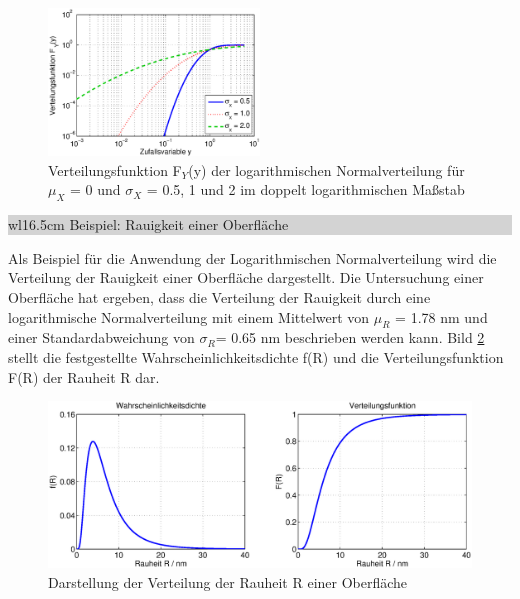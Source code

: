 \begin{figure}[H]
  \centerline{\includegraphics[width=0.5\textwidth]{Kapitel4/Bilder/image38}}
  \caption{Verteilungsfunktion F${}_{Y}$(y) der logarithmischen Normalverteilung f\"{u}r $\mu_{X}$ = 0 und $\sigma_{X}$ = 0.5, 1 und 2 im doppelt logarithmischen Ma{\ss}stab}
  \label{fig:Stetig_Lognormal2}
\end{figure}

\noindent
\colorbox{lightgray}{%
%
\renewcommand\arraystretch{0.6}%
\begin{tabular}{ wl{16.5cm} }
{\selectfont
\noindent
Beispiel: Rauigkeit einer Oberfl\"{a}che}
\end{tabular}%
}\bigskip

\noindent Als Beispiel f\"{u}r die Anwendung der Logarithmischen Normalverteilung wird die Verteilung der Rauigkeit einer Oberfl\"{a}che dargestellt. Die Untersuchung einer Oberfl\"{a}che hat ergeben, dass die Verteilung der Rauigkeit durch eine logarithmische Normalverteilung mit einem Mittelwert von $\mu_{R}$ = 1.78 nm und einer Standardabweichung von $\sigma_{R}$= 0.65 nm beschrieben werden kann. Bild \ref{fig:Lognormal_Oberflaechenrauheit} stellt die festgestellte Wahrscheinlichkeitsdichte f(R) und die Verteilungsfunktion F(R) der Rauheit R dar.

\begin{figure}[H]
  \centerline{\includegraphics[width=1\textwidth]{Kapitel4/Bilder/image39}}
  \caption{Darstellung der Verteilung der Rauheit R einer Oberfl\"{a}che}
  \label{fig:Lognormal_Oberflaechenrauheit}
\end{figure}

